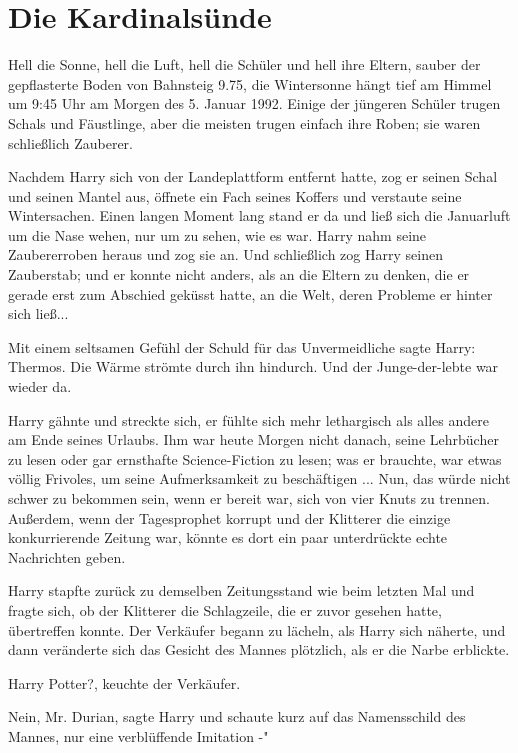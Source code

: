 \chapter{Die Kardinalsünde}

Hell die Sonne, hell die Luft, hell die Schüler und hell ihre Eltern, sauber der
gepflasterte Boden von Bahnsteig 9.75, die Wintersonne hängt tief am Himmel um
9:45 Uhr am Morgen des 5. Januar 1992. Einige der jüngeren Schüler trugen Schals
und Fäustlinge, aber die meisten trugen einfach ihre Roben; sie waren
schließlich Zauberer.

Nachdem Harry sich von der Landeplattform entfernt hatte, zog er seinen Schal
und seinen Mantel aus, öffnete ein Fach seines Koffers und verstaute seine
Wintersachen. Einen langen Moment lang stand er da und ließ sich die Januarluft
um die Nase wehen, nur um zu sehen, wie es war. Harry nahm seine Zaubererroben
heraus und zog sie an. Und schließlich zog Harry seinen Zauberstab; und er
konnte nicht anders, als an die Eltern zu denken, die er gerade erst zum
Abschied geküsst hatte, an die Welt, deren Probleme er hinter sich ließ...

Mit einem seltsamen Gefühl der Schuld für das Unvermeidliche sagte Harry: \glqq
Thermos.\grqq{} Die Wärme strömte durch ihn hindurch. Und der Junge-der-lebte
war wieder da.

Harry gähnte und streckte sich, er fühlte sich mehr lethargisch als alles andere
am Ende seines Urlaubs. Ihm war heute Morgen nicht danach, seine Lehrbücher zu
lesen oder gar ernsthafte Science-Fiction zu lesen; was er brauchte, war etwas
völlig Frivoles, um seine Aufmerksamkeit zu beschäftigen ... Nun, das würde
nicht schwer zu bekommen sein, wenn er bereit war, sich von vier Knuts zu
trennen. Außerdem, wenn der Tagesprophet korrupt und der Klitterer die einzige
konkurrierende Zeitung war, könnte es dort ein paar unterdrückte echte
Nachrichten geben.

Harry stapfte zurück zu demselben Zeitungsstand wie beim letzten Mal und fragte
sich, ob der Klitterer die Schlagzeile, die er zuvor gesehen hatte, übertreffen
konnte. Der Verkäufer begann zu lächeln, als Harry sich näherte, und dann
veränderte sich das Gesicht des Mannes plötzlich, als er die Narbe erblickte.

\glqq Harry Potter?\grqq{}, keuchte der Verkäufer.

\glqq Nein, Mr. Durian\grqq{}, sagte Harry und schaute kurz auf das Namensschild
des Mannes, \glqq nur eine verblüffende Imitation -"

